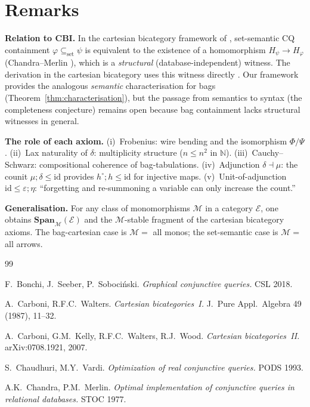 \documentclass[11pt,a4paper]{article}
\theoremstyle{definition}
\newcommand{\op}{{\circ}}
\newcommand{\Span}{\mathbf{Span}}
\newcommand{\N}{\mathbb{N}}
\newcommand{\id}{\mathrm{id}}
\begin{document}
\section{Remarks}
\label{sec:remarks}

\textbf{Relation to CBI.} In the cartesian bicategory framework of \cite{CW}, set-semantic CQ containment $\varphi \subseteq_{\mathrm{set}} \psi$ is equivalent to the existence of a homomorphism $H_\psi \to H_\varphi$ (Chandra--Merlin \cite{CM}), which is a \emph{structural} (database-independent) witness. The derivation in the cartesian bicategory uses this witness directly \cite{BSS}. Our framework provides the analogous \emph{semantic} characterisation for bags (Theorem~\ref{thm:characterisation}), but the passage from semantics to syntax (the completeness conjecture) remains open because bag containment lacks structural witnesses in general.

\medskip\noindent\textbf{The role of each axiom.} (i)~Frobenius: wire bending and the isomorphism $\Phi/\Psi$. (ii)~Lax naturality of $\delta$: multiplicity structure ($n \leq n^2$ in $\N$). (iii)~Cauchy--Schwarz: compositional coherence of bag-tabulations. (iv)~Adjunction $\delta \dashv \mu$: the counit $\mu;\delta \leq \id$ provides $h^\op;h \leq \id$ for injective maps. (v)~Unit-of-adjunction $\id \leq \varepsilon;\eta$: ``forgetting and re-summoning a variable can only increase the count.''

\medskip\noindent\textbf{Generalisation.} For any class of monomorphisms $\mathcal{M}$ in a category $\mathcal{E}$, one obtains $\Span_\mathcal{M}(\mathcal{E})$ and the $\mathcal{M}$-stable fragment of the cartesian bicategory axioms. The bag-cartesian case is $\mathcal{M} = $ all monos; the set-semantic case is $\mathcal{M} = $ all arrows.

\begin{thebibliography}{99}

F.~Bonchi, J.~Seeber, P.~Soboci\'nski.
\emph{Graphical conjunctive queries.}
CSL 2018.

A.~Carboni, R.F.C.~Walters.
\emph{Cartesian bicategories~I.}
J.~Pure Appl.\ Algebra 49 (1987), 11--32.

A.~Carboni, G.M.~Kelly, R.F.C.~Walters, R.J.~Wood.
\emph{Cartesian bicategories~II.}
arXiv:0708.1921, 2007.

S.~Chaudhuri, M.Y.~Vardi.
\emph{Optimization of real conjunctive queries.}
PODS 1993.

A.K.~Chandra, P.M.~Merlin.
\emph{Optimal implementation of conjunctive queries in relational databases.}
STOC 1977.

\end{thebibliography}
\end{document}
